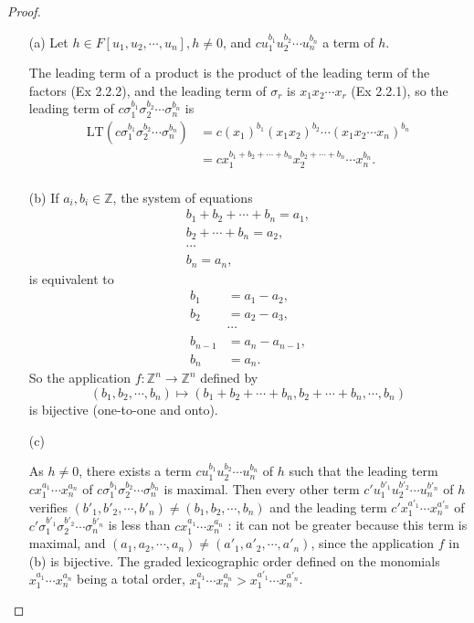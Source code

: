\documentclass[11pt,a4paper]{article}
\begin{document}
\begin{proof}
\begin{enumerate}
\item[(a)]
Let $h \in F[u_1,u_2,\cdots,u_n],h\neq 0$, and $cu_1^{b_1}u_2^{b_2}\cdots u_n^{b_n}$ a term of $h$.

The leading term of a product is the product of the leading term of the factors (Ex 2.2.2), and the leading term of $\sigma_r$ is $x_1x_2\cdots x_r$ (Ex 2.2.1),  so the leading term of $c\sigma_1^{b_1}\sigma_2^{b_2}\cdots \sigma_n^{b_n}$ is
\begin{align*}
{\mathrm  {LT}}(c\sigma_1^{b_1}\sigma_2^{b_2}\cdots \sigma_n^{b_n})&=c(x_1)^{b_1}(x_1x_2)^{b_2}\cdots(x_1x_2\cdots x_n)^{b_n}\\
&=c x_1^{b_1+b_2+\cdots+b_n} x_2^{b_2+\cdots+ b_n} \cdots x_n^{b_n}.\\
\end{align*}

\item[(b)]
If $a_i,b_i \in \mathbb{Z}$, the system of equations
\begin{align*}
 b_1+b_2+\cdots+b_n=a_1,\\
b_2+\cdots + b_n=a_2,\\
\cdots\\
b_n=a_n,
\end{align*}
is equivalent to
\begin{align*}
b_1 &=a_1-a_2,\\
b_2&=a_2-a_3,\\
&\cdots\\
b_{n-1} &= a_{n}-a_{n-1},\\
b_n &= a_n.
\end{align*}
So the application $f : \mathbb{Z}^n \to \mathbb{Z}^n$ defined by $$(b_1,b_2,\cdots,b_n)\mapsto (b_1+b_2+\cdots+b_n, b_2+\cdots+b_n, \cdots,b_n)$$ is bijective (one-to-one and onto).

\item[(c)]

As $h\neq 0$, there exists a term  $cu_1^{b_1}u_2^{b_2}\cdots u_n^{b_n}$ of $h$ such that the leading term $cx_1^{a_1}\cdots x_n^{a_n}$ of  $c\sigma_1^{b_1}\sigma_2^{b_2}\cdots \sigma_n^{b_n}$ is maximal. Then every other term $c'u_1^{b'_1}u_2^{b'_2}\cdots u_n^{b'_n}$ of $h$  verifies $(b'_1,b'_2,\cdots,b'_n) \neq (b_1,b_2,\cdots,b_n)$ and the leading term  $c'x_1^{a'_1}\cdots x_n^{a'_n}$ of $c'\sigma_1^{b'_1}\sigma_2^{b'_2}\cdots \sigma_n^{b'_n}$ is less than $cx_1^{a_1}\cdots x_n^{a_n}$ : it can not be greater because this term is maximal, and $(a_1,a_2,\cdots,a_n) \neq (a'_1,a'_2,\cdots,a'_n)$, since the application $f$ in (b) is bijective. The graded lexicographic order defined on the monomials $x_1^{a_1}\cdots x_n^{a_n}$ being a total order, $x_1^{a_1}\cdots x_n^{a_n} > x_1^{a'_1}\cdots x_n^{a'_n}$.


\end{enumerate}
\end{proof}
\end{document}
